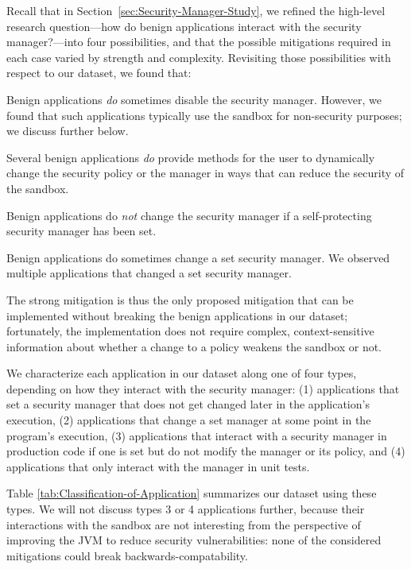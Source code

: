 \documentclass{sig-alternate}
\begin{document}

Recall that in Section~\ref{sec:Security-Manager-Study}, we refined the
high-level research question---how do benign applications interact with the
security manager?---into four possibilities, and that the possible mitigations
required in each case varied by strength and complexity.  Revisiting those
possibilities with respect to our dataset, we found that:
\begin{flushenum}\setlength{\parskip}{0pt}
  \setlength{\parsep}{0pt}
  \setlength{\itemsep}{0pt}
\item Benign applications \emph{do} sometimes disable the security manager.
  However, we found that such applications typically use the sandbox for
  non-security purposes; we discuss further below.

\item Several benign applications \emph{do} provide methods for the user to
  dynamically change the security policy or the manager in ways that can reduce
  the security of the sandbox.

\item Benign applications do \emph{not} change the
security manager if a self-protecting security manager has been set.  

\item Benign applications do sometimes change a set security manager.  We
  observed multiple applications that changed a set security manager.
\end{flushenum}

The strong mitigation is thus the only proposed mitigation that can be
implemented without breaking the benign applications in our dataset;
fortunately, the implementation does not require complex, context-sensitive
information about whether a change to a policy weakens the sandbox or not. 

We characterize each application in our dataset along one of four types, depending on how they
interact with the security manager:
(1) applications that set a
security manager that does not get changed later in the application's
execution, (2) applications that change a set manager at some point
in the program's execution, (3) applications that interact with a
security manager in production code if one is set but do not modify the manager
or its policy, and (4) applications
that only interact with the manager in unit tests. 

Table \ref{tab:Classification-of-Application}
summarizes our dataset using these types.   We will
not discuss types 3 or 4 applications further, because their interactions with
the sandbox are not interesting from the perspective of improving the JVM to
reduce security vulnerabilities: none of the considered mitigations could break
backwards-compatability.  
\end{document}
